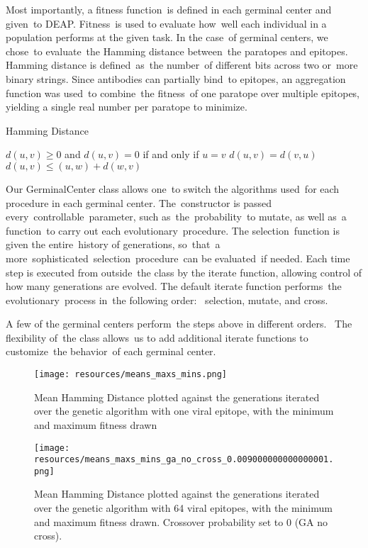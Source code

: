 \documentclass[conference]{IEEEtran}
\begin{document}
Most importantly, a fitness function is defined in each germinal center and given to DEAP. Fitness is used to evaluate how well each individual in a population performs at the given task. In the case of germinal centers, we chose to evaluate the Hamming distance between the paratopes and epitopes. Hamming distance is defined as the number of different bits across two or more binary strings. Since antibodies can partially bind to epitopes, an aggregation function was used to combine the fitness of one paratope over multiple epitopes, yielding a single real number per paratope to minimize.

\begin{algorithm}
\caption{Hamming Distance}\label{alg:cap}

\State $d(u,v) \geq 0$  and $d(u,v)=0$  if and only if $u=v$
\State $d(u,v)=d(v,u)$
\State $d(u,v) \leq (u,w)+d(w,v)$
\end{algorithm}



Our GerminalCenter class allows one to switch the algorithms used for each procedure in each germinal center. The constructor is passed every controllable parameter, such as the probability to mutate, as well as a function to carry out each evolutionary procedure. The selection function is given the entire history of generations, so that a more sophisticated selection procedure can be evaluated if needed. Each time step is executed from outside the class by the iterate function, allowing control of how many generations are evolved. The default iterate function performs the evolutionary process in the following order:  selection, mutate, and cross.

A few of the germinal centers perform the steps above in different orders.  The flexibility of the class allows us to add additional iterate functions to customize the behavior of each germinal center.

\begin{figure}[htbp]
\centerline{\texttt{[image: resources/means\_maxs\_mins.png]}}
\caption{Mean Hamming Distance plotted against the generations iterated over the genetic algorithm with one viral epitope, with the minimum and maximum fitness drawn}
\label{oneepitope}
\end{figure}

\begin{figure}[htbp]
\centerline{\texttt{[image: resources/means\_maxs\_mins\_ga\_no\_cross\_0.009000000000000001.png]}}
\caption{Mean Hamming Distance plotted against the generations iterated over the genetic algorithm with 64 viral epitopes, with the minimum and maximum fitness drawn. Crossover probability set to 0 (GA no cross).}
\label{multiepitope}
\end{figure}
\end{document}
